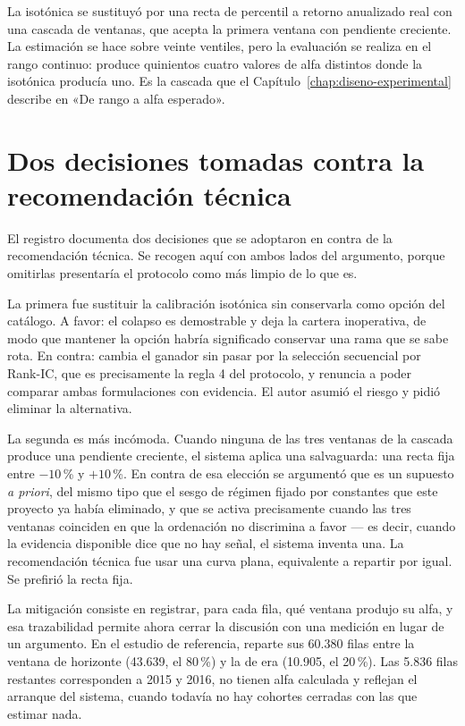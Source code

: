 La isotónica se sustituyó por una recta de percentil a retorno anualizado real con una cascada de
ventanas, que acepta la primera ventana con pendiente creciente. La estimación se hace sobre veinte
ventiles, pero la evaluación se realiza en el rango continuo: produce quinientos cuatro valores de
alfa distintos donde la isotónica producía uno. Es la cascada que el
Capítulo~\ref{chap:diseno-experimental} describe en «De rango a alfa esperado».

\section{Dos decisiones tomadas contra la recomendación técnica}

El registro documenta dos decisiones que se adoptaron en contra de la recomendación técnica. Se
recogen aquí con ambos lados del argumento, porque omitirlas presentaría el protocolo como más
limpio de lo que es.

La primera fue sustituir la calibración isotónica sin conservarla como opción del catálogo. A favor:
el colapso es demostrable y deja la cartera inoperativa, de modo que mantener la opción habría
significado conservar una rama que se sabe rota. En contra: cambia el ganador sin pasar por la
selección secuencial por Rank-IC, que es precisamente la regla 4 del protocolo, y renuncia a poder
comparar ambas formulaciones con evidencia. El autor asumió el riesgo y pidió eliminar la
alternativa.

La segunda es más incómoda. Cuando ninguna de las tres ventanas de la cascada produce una pendiente
creciente, el sistema aplica una salvaguarda: una recta fija entre $-10$\,\% y $+10$\,\%. En contra
de esa elección se argumentó que es un supuesto \emph{a priori}, del mismo tipo que el sesgo de
régimen fijado por constantes que este proyecto ya había eliminado, y que se activa precisamente
cuando las tres ventanas coinciden en que la ordenación no discrimina a favor --- es decir, cuando
la evidencia disponible dice que no hay señal, el sistema inventa una. La recomendación técnica fue
usar una curva plana, equivalente a repartir por igual. Se prefirió la recta fija.

La mitigación consiste en registrar, para cada fila, qué ventana produjo su alfa, y esa trazabilidad
permite ahora cerrar la discusión con una medición en lugar de un argumento. En el estudio de
referencia,  reparte sus 60.380 filas entre la
ventana de horizonte (43.639, el 80\,\%) y la de era (10.905, el 20\,\%). Las 5.836 filas restantes
corresponden a 2015 y 2016, no tienen alfa calculada y reflejan el arranque del sistema, cuando
todavía no hay cohortes cerradas con las que estimar nada.

